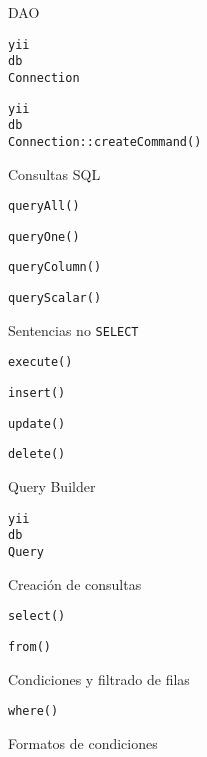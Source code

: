 \begin{longenum}
    \begin{longenum}
        \item DAO
        \begin{longenum}
            \item \texttt{yii\\db\\Connection}
            \item \texttt{yii\\db\\Connection::createCommand()}
            \item Consultas SQL
            \begin{longenum}
                \item \texttt{queryAll()}
                \item \texttt{queryOne()}
                \item \texttt{queryColumn()}
                \item \texttt{queryScalar()}
            \end{longenum}
            \item Sentencias no \texttt{SELECT}
            \begin{longenum}
                \item \texttt{execute()}
                \item \texttt{insert()}
                \item \texttt{update()}
                \item \texttt{delete()}
            \end{longenum}
        \end{longenum}
        \item Query Builder
        \begin{longenum}
            \item \texttt{yii\\db\\Query}
            \item Creación de consultas
            \begin{longenum}
                \item \texttt{select()}
                \item \texttt{from()}
                \item Condiciones y filtrado de filas
                \begin{longenum}
                    \item \texttt{where()}
                    \item Formatos de condiciones

\end{longenum}
\end{longenum}
\end{longenum}
\end{longenum}
\end{longenum}
